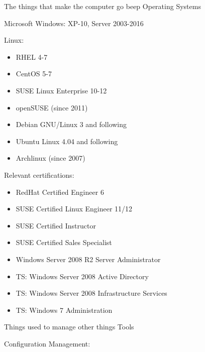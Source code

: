 

\begin{cventries}
  \cventry
    {The things that make the computer go beep}
    {Operating Systems}
		{}
    {}
    {
			\begin{cvitems}
				\item Microsoft Windows: XP-10, Server 2003-2016
				\item Linux:
          \begin{itemize}
            \item RHEL 4-7
            \item CentOS 5-7
            \item SUSE Linux Enterprise 10-12
            \item openSUSE (since 2011)
            \item Debian GNU/Linux 3 and following
            \item Ubuntu Linux 4.04 and following
            \item Archlinux (since 2007)
          \end{itemize}
        \item Relevant certifications:
          \begin{itemize}
            \item RedHat Certified Engineer 6
            \item SUSE Certified Linux Engineer 11/12
            \item SUSE Certified Instructor
            \item SUSE Certified Sales Specialist
            \item Windows Server 2008 R2 Server Administrator
            \item TS: Windows Server 2008 Active Directory
            \item TS: Windows Server 2008 Infrastructure Services
            \item TS: Windows 7 Administration
          \end{itemize}
      \end{cvitems}
    }
  \cventry
    {Things used to manage other things}
    {Tools}
    {}
    {}
    {
      \begin{cvitems}
        \item Configuration Management:

\end{cvitems}}
\end{cventries}
